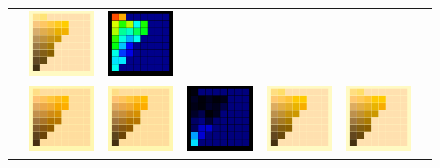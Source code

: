 \begin{figure}[t!]
{\begin{tabular}{ccccccc}
			&
			\includegraphics[width=.155\linewidth]{img/results_uplift_page10_sigmoidFL11.png}
			&
			\includegraphics[width=.155\linewidth]{img/results_uplift_page10_diff_sigmoidFL11.png}
			\\ \raisebox{0.5cm}[0pt][0pt]{\parbox[c][0pt][c]{0cm}{\hspace{-1.5em}\\[20pt]}\par}
			&
			\includegraphics[width=.155\linewidth]{img/results_uplift_page09_originalFL11.png}
			&
			\includegraphics[width=.155\linewidth]{img/results_uplift_page09_ourFL11.png}
			& 
			\includegraphics[width=.155\linewidth]{img/results_uplift_page09_diff_ourFL11.png}
			&\quad
			\includegraphics[width=.155\linewidth]{img/results_uplift_page10_originalFL11.png}
			&
			\includegraphics[width=.155\linewidth]{img/results_uplift_page10_ourFL11.png}

\end{tabular}}
\end{figure}
